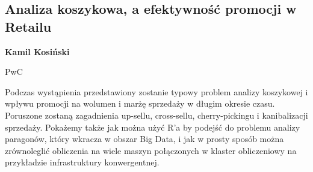 \documentclass[\main/boa.tex]{subfiles}
\begin{document}
\subsection{Analiza koszykowa, a efektywność promocji w Retailu}

\begin{minipage}{0.915\textwidth}
	\centering
  {\bf {} Kamil Kosiński}
\end{minipage}


\begin{affiliations}
\begin{minipage}{0.915\textwidth}
\centering
PwC \\[-2pt]
\end{minipage}
\end{affiliations}

\vskip 0.3cm

 Podczas wystąpienia przedstawiony zostanie typowy problem analizy koszykowej \break i wpływu promocji na wolumen i marżę sprzedaży w długim okresie czasu. Poruszone zostaną zagadnienia up-sellu, cross-sellu, cherry-pickingu i kanibalizacji sprzedaży. Pokażemy także jak można użyć R'a by podejść do problemu analizy paragonów, który wkracza w obszar Big Data, i jak w prosty sposób można zrównoleglić obliczenia na wiele maszyn połączonych w klaster obliczeniowy na przykładzie infrastruktury konwergentnej. 
\end{document}
